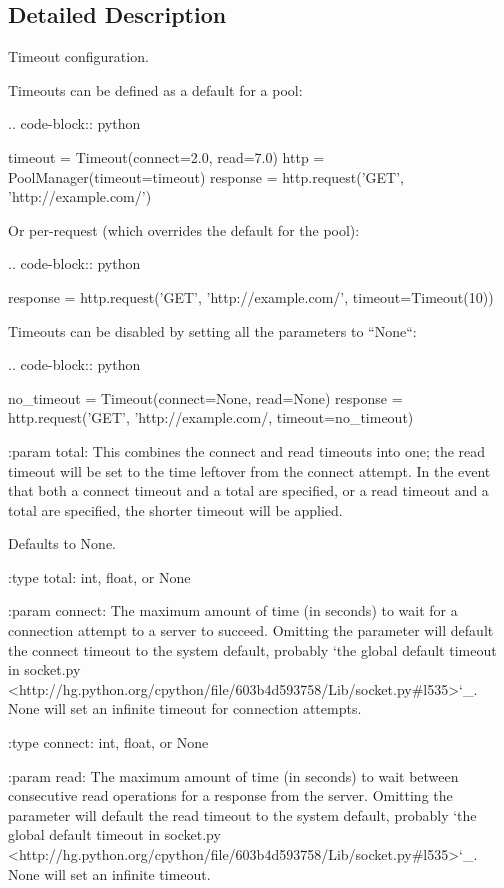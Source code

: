 \subsection{Detailed Description}
\begin{DoxyVerb}Timeout configuration.

Timeouts can be defined as a default for a pool:

.. code-block:: python

   timeout = Timeout(connect=2.0, read=7.0)
   http = PoolManager(timeout=timeout)
   response = http.request('GET', 'http://example.com/')

Or per-request (which overrides the default for the pool):

.. code-block:: python

   response = http.request('GET', 'http://example.com/', timeout=Timeout(10))

Timeouts can be disabled by setting all the parameters to ``None``:

.. code-block:: python

   no_timeout = Timeout(connect=None, read=None)
   response = http.request('GET', 'http://example.com/, timeout=no_timeout)


:param total:
    This combines the connect and read timeouts into one; the read timeout
    will be set to the time leftover from the connect attempt. In the
    event that both a connect timeout and a total are specified, or a read
    timeout and a total are specified, the shorter timeout will be applied.

    Defaults to None.

:type total: int, float, or None

:param connect:
    The maximum amount of time (in seconds) to wait for a connection
    attempt to a server to succeed. Omitting the parameter will default the
    connect timeout to the system default, probably `the global default
    timeout in socket.py
    <http://hg.python.org/cpython/file/603b4d593758/Lib/socket.py#l535>`_.
    None will set an infinite timeout for connection attempts.

:type connect: int, float, or None

:param read:
    The maximum amount of time (in seconds) to wait between consecutive
    read operations for a response from the server. Omitting the parameter
    will default the read timeout to the system default, probably `the
    global default timeout in socket.py
    <http://hg.python.org/cpython/file/603b4d593758/Lib/socket.py#l535>`_.
    None will set an infinite timeout.


\end{DoxyVerb}
